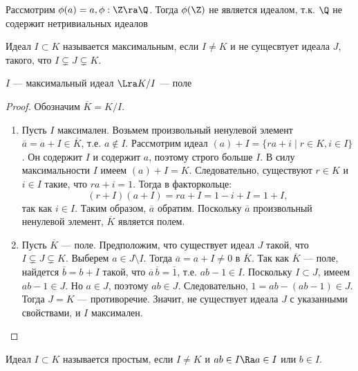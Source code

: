 \begin{example}
    Рассмотрим \(\phi(a) = a, \phi: \Z \ra \Q\). Тогда \(\phi(\Z)\) не является идеалом, т.к. \(\Q\) не содержит нетривиальных идеалов
\end{example}

\begin{definition}
    Идеал \(I \subset K\) называется максимальным, если \(I \ne K\) и не сущесвтует идеала \(J\), такого, что \(I \subsetneq J \subsetneq K\).
\end{definition}

\begin{proposition}
    \(I\) --- максимальный идеал \(\Lra K/I\) --- поле
\end{proposition}
\begin{proof}
    Обозначим \(\overline{K} = K/I\).

    \begin{enumerate}
        \item[\(\Ra\)] Пусть \(I\) максимален. Возьмем произвольный ненулевой элемент \(\overline{a} = a + I \in \overline{K}\), т.е. \(a \notin I\). Рассмотрим идеал \((a) + I = \{ra + i \mid r \in K, i \in I\}\). Он содержит \(I\) и содержит \(a\), поэтому строго больше \(I\). В силу максимальности \(I\) имеем \((a) + I = K\). Следовательно, существуют \(r \in K\) и \(i \in I\) такие, что \(ra + i = 1\). Тогда в факторкольце:
        \[
        (r + I)(a + I) = ra + I = 1 - i + I = 1 + I,
        \]
        так как \(i \in I\). Таким образом, \(\overline{a}\) обратим. Поскольку \(\overline{a}\) произвольный ненулевой элемент, \(\overline{K}\) является полем.

        \item[\(\La\)] Пусть \(\overline{K}\) --- поле. Предположим, что существует идеал \(J\) такой, что \(I \subsetneq J \subsetneq K\). Выберем \(a \in J \setminus I\). Тогда \(\overline{a} = a + I \neq 0\) в \(\overline{K}\). Так как \(\overline{K}\) --- поле, найдется \(\overline{b} = b + I\) такой, что \(\overline{a}\,\overline{b} = \overline{1}\), т.е. \(ab - 1 \in I\). Поскольку \(I \subset J\), имеем \(ab - 1 \in J\). Но \(a \in J\), поэтому \(ab \in J\). Следовательно, \(1 = ab - (ab - 1) \in J\). Тогда \(J = K\) --- противоречие. Значит, не существует идеала \(J\) с указанными свойствами, и \(I\) максимален.
    \end{enumerate}
\end{proof}

\begin{definition}
    Идеал \(I \subset K\) называется простым, если \(I \ne K\) и \(ab \in I \Ra a \in I\) или \(b \in I\).
\end{definition}

